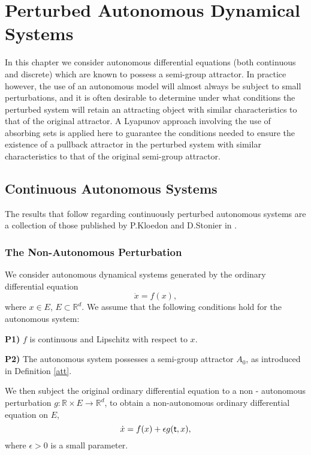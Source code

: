 
\chapter[Non-Autonomously Perturbed Systems]{Perturbed Autonomous Dynamical Systems}
        \label{pertautchapter}

In this chapter we consider autonomous differential equations (both
continuous and discrete) which are known to possess a semi-group attractor.
In practice however, the use of an autonomous model will almost
always be subject to small perturbations, and it is often
desirable to determine under what conditions the perturbed system
will retain an attracting object with similar characteristics to
that of the original attractor. A Lyapunov approach involving the
use of absorbing sets is applied here to guarantee the conditions
needed to ensure the existence of a pullback attractor in the
perturbed system with similar characteristics to that of the
original semi-group attractor.

\section{Continuous Autonomous Systems}\label{Cpertautsec}

The results that follow regarding continuously perturbed
autonomous systems are a collection of those  published by
P.Kloedon and D.Stonier in \cite{PkSt97}.

\subsection{The Non-Autonomous Perturbation}

We consider autonomous dynamical systems generated by the ordinary
differential equation
\begin{equation} \label{aodeeq}
  \dot{x} = f(x),
\end{equation}
where $x \in E$, $E \subset \mathbb{R}^d$. We assume that the following conditions 
hold for the autonomous system:

\textbf{P1)} $f$ is continuous and Lipschitz with respect to $x$.

\textbf{P2)} The autonomous system possesses a semi-group attractor $A_0$, as
introduced in Definition \ref{att}.

We then subject the original ordinary differential equation to a
non - autonomous perturbation $g:\mathbb{R}
\times E \to \mathbb{R}^d$, to obtain a non-autonomous ordinary
differential equation on $E$,
\begin{equation} \label{pertnodeeq}
  \dot{x} = f(x) + \epsilon g( \mathsf{\mathsf{t}},x),
\end{equation}
where $\epsilon > 0$ is a small parameter.

